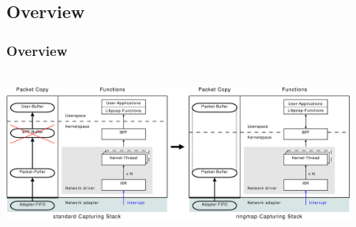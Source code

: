 \documentclass{beamer}
\begin{document}
\begin{frame}
\begin{columns}
\end{columns}
\end{frame}

\subsection*{Overview}
\begin{frame}
\frametitle{Overview}
\begin{center}
\includegraphics [height=55mm,width=115mm]{pics/Ueberblick_new}
\end{center}
\end{frame}
\end{document}

